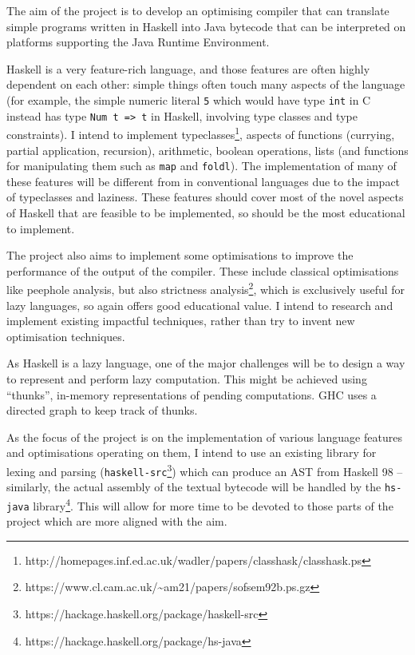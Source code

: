 \documentclass[12pt]{article}
\newcommand\haskell[1]{\texttt{#1}}
\newcommand\monospace[1]{\texttt{#1}}
\begin{document}
The aim of the project is to develop an optimising compiler that can translate simple programs written in Haskell into
Java bytecode that can be interpreted on platforms supporting the Java Runtime Environment.

Haskell is a very feature-rich language, and those features are often highly dependent on each other: simple things
often touch many aspects of the language (for example, the simple numeric literal \haskell{5} which would have type
\texttt{int} in C instead has type \haskell{Num t => t} in Haskell, involving type classes and type constraints).
I intend to implement typeclasses\footnote{http://homepages.inf.ed.ac.uk/wadler/papers/classhask/classhask.ps}, aspects
of functions (currying, partial application, recursion), arithmetic, boolean operations, lists (and functions for
manipulating them such as \haskell{map} and \haskell{foldl}). The implementation of many of these features will be
different from in conventional languages due to the impact of typeclasses and laziness. These features should cover most
of the novel aspects of Haskell that are feasible to be implemented, so should be the most educational to implement.

The project also aims to implement some optimisations to improve the performance of the output of the compiler. These
include classical optimisations like peephole analysis, but also strictness
analysis\footnote{https://www.cl.cam.ac.uk/\~{}am21/papers/sofsem92b.ps.gz}, which is exclusively useful for lazy
languages, so again offers good educational value. I intend to research and implement existing impactful techniques,
rather than try to invent new optimisation techniques.

As Haskell is a lazy language, one of the major challenges will be to design a way to represent and perform lazy
computation. This might be achieved using ``thunks'', in-memory representations of pending computations. GHC uses a
directed graph to keep track of thunks.

As the focus of the project is on the implementation of various language features and optimisations operating on them, I
intend to use an existing library for lexing and parsing
(\monospace{haskell-src}\footnote{https://hackage.haskell.org/package/haskell-src}) which can produce an AST from
Haskell 98 -- similarly, the actual assembly of the textual bytecode will be handled by the \monospace{hs-java}
library\footnote{https://hackage.haskell.org/package/hs-java}. This will allow for more time to be devoted to those
parts of the project which are more aligned with the aim.
\end{document}
